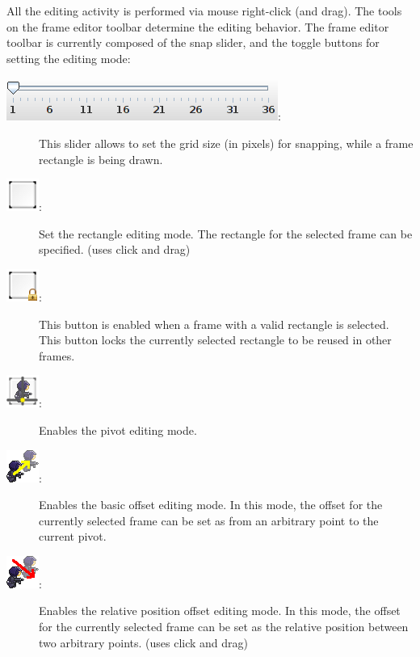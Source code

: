 \documentclass{article}
\begin{document}
All the editing activity is performed via mouse right-click (and drag). The tools on the frame editor toolbar determine the editing behavior. The frame editor toolbar is currently composed of the snap slider, and the toggle buttons for setting the editing mode:
\begin{description}
\item[\includegraphics{icons/SnapSliderScreenshot}:] This slider allows to set the grid size (in pixels) for snapping, while a frame rectangle is being drawn.
\item[\includegraphics{icons/EditRectangle}:]	Set the rectangle editing mode. The rectangle for the selected frame can be specified. (uses click and drag)
\item[\includegraphics{icons/LockRectangle}:]	This button is enabled when a frame with a valid rectangle is selected. This button locks the currently selected rectangle to be reused in other frames.
\item[\includegraphics{icons/SetPivot}:]	Enables the pivot editing mode.
\item[\includegraphics{icons/SetOffset}:] Enables the basic offset editing mode. In this mode, the offset for the currently selected frame can be set as from an arbitrary point to the current pivot.
\item[\includegraphics{icons/RelativeOffset}:]	Enables the relative position offset editing mode. In this mode, the offset for the currently selected frame can be set as the relative position between two arbitrary points. (uses click and drag)

\end{description}
\end{document}
